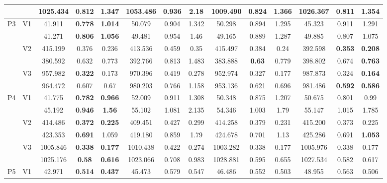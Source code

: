 \documentclass[12pt,a4paper]{article}
\begin{document}
\begin{sidewaystable}[ht]
{\begin{tabular}{cc|ccc|ccc|ccc|ccc|}
   &  & 1025.434 & 0.812 & \textbf{1.347} & 1053.486 & 0.936 & 2.18 & 1009.490 & 0.824 & 1.366 & 1026.367 & \textbf{0.811} & 1.354 \\ 
   \hline \hline\multirow{6}{*}{P3} & \multirow{2}{*}{V1} & 41.911 & \textbf{0.778} & \textbf{1.014} & 50.079 & 0.904 & 1.342 & 50.298 & 0.894 & 1.295 & 45.323 & 0.911 & 1.291 \\ 
   &  & 41.271 & \textbf{0.806} & \textbf{1.056} & 49.481 & 0.954 & 1.46 & 49.165 & 0.889 & 1.287 & 49.885 & 0.807 & 1.075 \\ 
   & \multirow{2}{*}{V2} & 415.199 & 0.376 & 0.236 & 413.536 & 0.459 & 0.35 & 415.497 & 0.384 & 0.24 & 392.598 & \textbf{0.353} & \textbf{0.208} \\ 
   &  & 380.592 & 0.632 & 0.773 & 392.766 & 0.813 & 1.483 & 383.888 & \textbf{0.63} & 0.779 & 398.802 & 0.674 & \textbf{0.763} \\ 
   & \multirow{2}{*}{V3} & 957.982 & \textbf{0.322} & 0.173 & 970.396 & 0.419 & 0.278 & 952.974 & 0.327 & 0.177 & 987.873 & 0.324 & \textbf{0.164} \\ 
   &  & 964.472 & 0.607 & 0.67 & 980.203 & 0.766 & 1.158 & 953.136 & 0.621 & 0.696 & 981.486 & \textbf{0.592} & \textbf{0.586} \\ 
   \hline \hline\multirow{6}{*}{P4} & \multirow{2}{*}{V1} & 41.775 & \textbf{0.782} & \textbf{0.966} & 52.009 & 0.911 & 1.308 & 50.348 & 0.875 & 1.207 & 50.675 & 0.801 & 0.99 \\ 
   &  & 45.192 & \textbf{0.946} & \textbf{1.56} & 55.102 & 1.081 & 2.135 & 54.346 & 1.003 & 1.79 & 55.147 & 1.015 & 1.785 \\ 
   & \multirow{2}{*}{V2} & 414.486 & \textbf{0.372} & \textbf{0.225} & 409.451 & 0.427 & 0.299 & 414.258 & 0.379 & 0.231 & 415.200 & 0.373 & 0.225 \\ 
   &  & 423.353 & \textbf{0.691} & 1.059 & 419.180 & 0.859 & 1.79 & 424.678 & 0.701 & 1.13 & 425.286 & 0.691 & \textbf{1.053} \\ 
   & \multirow{2}{*}{V3} & 1005.846 & \textbf{0.338} & \textbf{0.177} & 1010.438 & 0.422 & 0.274 & 1003.282 & 0.338 & 0.177 & 1005.976 & 0.338 & 0.177 \\ 
   &  & 1025.176 & \textbf{0.58} & \textbf{0.616} & 1023.066 & 0.708 & 0.983 & 1028.881 & 0.595 & 0.655 & 1027.534 & 0.582 & 0.617 \\ 
   \hline \hline\multirow{6}{*}{P5} & \multirow{2}{*}{V1} & 42.971 & \textbf{0.514} & \textbf{0.437} & 45.473 & 0.579 & 0.547 & 46.486 & 0.552 & 0.503 & 48.955 & 0.563 & 0.506 \\ 

\end{tabular}}
\end{sidewaystable}
\end{document}
